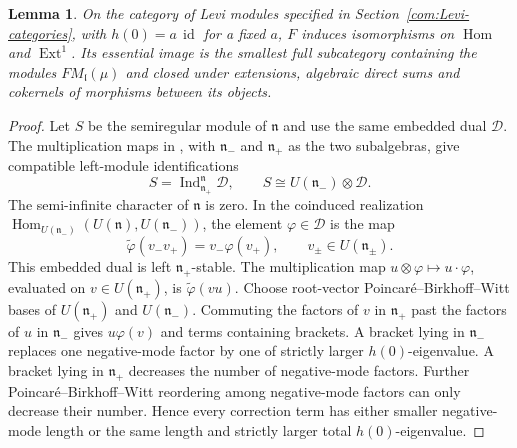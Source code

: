\documentclass[11pt,a4paper]{amsart}
\numberwithin{equation}{section}
\newtheorem{lemma}[theorem]{Lemma}
\theoremstyle{definition}
\theoremstyle{remark}
\newcommand{\lev}{\mathfrak l}
\newcommand{\id}{\operatorname{id}}
\begin{document}
\begin{lemma}\label{com:induction-fully-faithful}
On the category of Levi modules specified in
Section~\ref{com:Levi-categories}, with $h(0)=a\,\id$ for a fixed $a$,
$F$ induces isomorphisms on $\operatorname{Hom}$ and
$\operatorname{Ext}^1$. Its essential image is the smallest full
subcategory containing the modules $FM_\lev(\mu)$ and closed under
extensions, algebraic direct sums and cokernels of morphisms between
its objects.
\end{lemma}
\begin{proof}
Let $S$ be the semiregular module of $\mathfrak n$ and use the
same embedded dual $\mathcal D$. The multiplication maps
in \cite[\S2.4, Eqs.~(5)--(6), and Lemma~2.4]{ABGG}, with
$\mathfrak n_-$ and $\mathfrak n_+$ as the two subalgebras, give
compatible left-module identifications
\begin{equation}\label{com:compatible-semiregular}
 S=\operatorname{Ind}_{\mathfrak n_+}^{\mathfrak n}\mathcal D,
 \qquad S\cong U(\mathfrak n_-)\otimes\mathcal D.
\end{equation}
The semi-infinite character of $\mathfrak n$ is zero. In the coinduced
realization
$\operatorname{Hom}_{U(\mathfrak n_-)}(U(\mathfrak n),U(\mathfrak n_-))$,
the element $\varphi\in\mathcal D$ is the map
$$
 \widetilde\varphi(v_-v_+)=v_-\varphi(v_+),
 \qquad v_\pm\in U(\mathfrak n_\pm).
$$
This embedded dual is left $\mathfrak n_+$-stable. The multiplication
map $u\otimes\varphi\mapsto u\cdot\varphi$, evaluated on
$v\in U(\mathfrak n_+)$, is $\widetilde\varphi(vu)$.
Choose root-vector Poincar\'e--Birkhoff--Witt bases of
$U(\mathfrak n_+)$ and $U(\mathfrak n_-)$.
Commuting the factors of $v$ in $\mathfrak n_+$ past the factors
of $u$ in $\mathfrak n_-$ gives $u\varphi(v)$ and terms containing brackets.
A bracket lying in $\mathfrak n_-$ replaces one negative-mode factor
by one of strictly larger $h(0)$-eigenvalue. A bracket lying in
$\mathfrak n_+$ decreases the number of negative-mode factors.
Further Poincar\'e--Birkhoff--Witt reordering among negative-mode factors
can only decrease their number. Hence every correction term has either
smaller negative-mode length or the same length and strictly larger
total $h(0)$-eigenvalue.


\end{proof}
\end{document}
